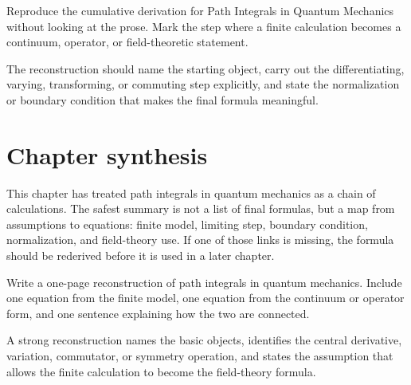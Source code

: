 \begin{exercise}
Reproduce the cumulative derivation for Path Integrals in Quantum Mechanics without looking at the prose.  Mark the step where a finite calculation becomes a continuum, operator, or field-theoretic statement.
\begin{answer}
The reconstruction should name the starting object, carry out the differentiating, varying, transforming, or commuting step explicitly, and state the normalization or boundary condition that makes the final formula meaningful.
\end{answer}
\end{exercise}



\section{Chapter synthesis}

This chapter has treated path integrals in quantum mechanics as a chain of calculations.  The safest summary is not a list of final formulas, but a map from assumptions to equations: finite model, limiting step, boundary condition, normalization, and field-theory use.  If one of those links is missing, the formula should be rederived before it is used in a later chapter.

\begin{exercise}
Write a one-page reconstruction of path integrals in quantum mechanics.  Include one equation from the finite model, one equation from the continuum or operator form, and one sentence explaining how the two are connected.
\begin{answer}
A strong reconstruction names the basic objects, identifies the central derivative, variation, commutator, or symmetry operation, and states the assumption that allows the finite calculation to become the field-theory formula.
\end{answer}
\end{exercise}
